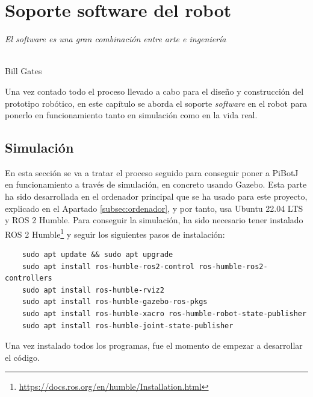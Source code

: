 \chapter{Soporte software del robot}
\label{cap:capitulo6}



\begin{flushright}
\begin{minipage}[]{10cm}
\emph{El software es una gran combinación entre arte e ingeniería}\\
\end{minipage}\\

Bill Gates\\
\end{flushright}

\vspace{1cm}
\setcounter{footnote}{84}

Una vez contado todo el proceso llevado a cabo para el diseño y construcción del prototipo robótico, en este capítulo se aborda el soporte \textit{software} en el robot para ponerlo en funcionamiento tanto en simulación como en la vida real.

\section{Simulación}
\label{sec:simulacion}

En esta sección se va a tratar el proceso seguido para conseguir poner a PiBotJ en funcionamiento a través de simulación, en concreto usando Gazebo. Esta parte ha sido desarrollada en el ordenador principal que se ha usado para este proyecto, explicado en el Apartado \ref{subsec:ordenador}, y por tanto, usa Ubuntu 22.04 \acs{LTS} y ROS 2 Humble. Para conseguir la simulación, ha sido necesario tener instalado ROS 2 Humble\footnote{\url{https://docs.ros.org/en/humble/Installation.html}} y seguir los siguientes pasos de instalación: 

\begin{verbatim}
	sudo apt update && sudo apt upgrade
	sudo apt install ros-humble-ros2-control ros-humble-ros2-controllers
	sudo apt install ros-humble-rviz2
	sudo apt install ros-humble-gazebo-ros-pkgs
	sudo apt install ros-humble-xacro ros-humble-robot-state-publisher 
	sudo apt install ros-humble-joint-state-publisher
\end{verbatim}

Una vez instalado todos los programas, fue el momento de empezar a desarrollar el código. 

